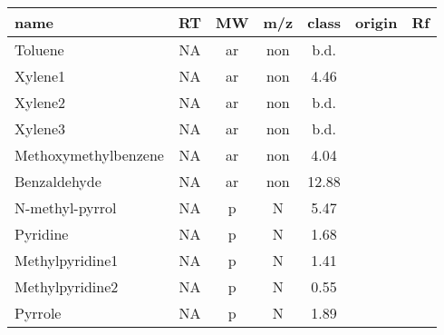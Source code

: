 \documentclass[preprint,review,12pt]{elsarticle}
\begin{document}
\newpage
\begin{table*}[h!]
\begin{center}
{\tiny
\begin{tabular}{lcccccc}
\hline
name & RT & MW & m/z & class & origin&Rf\\
\hline
Toluene&NA&ar&non&b.d.\\
Xylene1&NA&ar&non&4.46\\
Xylene2&NA&ar&non&b.d.\\
Xylene3&NA&ar&non&b.d.\\
Methoxymethylbenzene&NA&ar&non&4.04\\
Benzaldehyde&NA&ar&non&12.88\\
N-methyl-pyrrol&NA&p&N&5.47\\
Pyridine&NA&p&N&1.68\\
Methylpyridine1&NA&p&N&1.41\\
Methylpyridine2&NA&p&N&0.55\\
Pyrrole&NA&p&N&1.89\\

\end{tabular}}
\end{center}
\end{table*}
\end{document}
